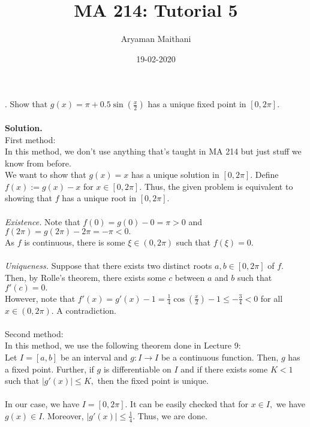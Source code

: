 \documentclass{article}
\title{MA 214: Tutorial 5}
\author{Aryaman Maithani}
\date{19-02-2020}
\begin{document}
. Show that $g(x) = \pi + 0.5\sin\left(\frac{x}{2}\right)$ has a unique fixed point in $[0, 2\pi].$\\~\\
\textbf{Solution.}\\
First method:\\
In this method, we don't use anything that's taught in MA 214 but just stuff we know from before.\\
We want to show that $g(x) = x$ has a unique solution in $[0, 2\pi].$ Define $f(x) := g(x) - x$ for $x \in [0, 2\pi].$ Thus, the given problem is equivalent to showing that $f$ has a unique root in $[0, 2\pi].$\\~\\
\emph{Existence.} Note that $f(0) = g(0) - 0 = \pi > 0$ and $f(2\pi) = g(2\pi) - 2\pi = -\pi < 0.$\\
As $f$ is continuous, there is some $\xi \in (0, 2\pi)$ such that $f(\xi) = 0.$\\~\\
\emph{Uniqueness.} Suppose that there exists two distinct roots $a, b \in [0, 2\pi]$ of $f.$ Then, by Rolle's theorem, there exists some $c$ between $a$ and $b$ such that $f'(c) = 0.$\\
However, note that $f'(x) = g'(x) - 1 = \frac{1}{4}\cos\left(\frac{x}{2}\right)-1 \le -\frac{3}{4} < 0$ for all $x \in (0, 2\pi).$ A contradiction.\\~\\
Second method:\\
In this method, we use the following theorem done in Lecture 9:\\
Let $I = [a, b]$ be an interval and $g:I\to I$ be a continuous function. Then, $g$ has a fixed point. Further, if $g$ is differentiable on $I$ and if there exists some $K < 1$ such that $|g'(x)| \le K,$ then the fixed point is unique.\\~\\
In our case, we have $I = [0, 2\pi].$  It can be easily checked that for $x \in I,$ we have $g(x) \in I.$ Moreover, $|g'(x)| \le \frac{1}{4}.$ Thus, we are done.
\end{document}
